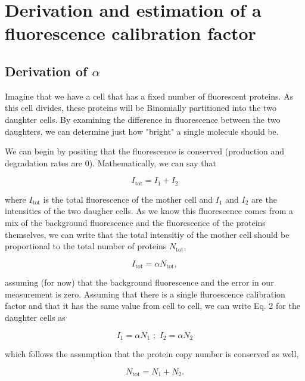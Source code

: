 \section{Derivation and estimation of a fluorescence calibration factor}

\subsection*{Derivation of $\alpha$}

Imagine that we have a cell that has a fixed number of fluorescent proteins.  As this cell divides, these proteins will be Binomially partitioned into the two daughter cells. By examining the difference in fluorescence between the two daughters, we can determine just how "bright" a single molecule should be.

We can begin by positing that the fluorescence is conserved (production and degradation rates are 0). Mathematically, we can say that

\begin{equation}
I_\text{tot} = I_1 + I_2
\end{equation}

where $I_\text{tot}$ is the total fluorescence of the mother cell and $I_1$ and
$I_2$ are the intensities of the two daugher cells. As we know this
fluorescence comes from a mix of the background fluorescence and the
fluorescence of the proteins themselves, we can write that the total intensitiy
of the mother cell should be proportional to the total number of proteins
$N_\text{tot}$,

\begin{equation}
I_\text{tot} = \alpha N_\text{tot},
\end{equation}

assuming (for now) that the background fluorescence and the error in our measurement is zero. Assuming that there is a single fluroescence calibration factor and that it has the same value from cell to cell, we can write Eq. 2 for the daughter cells as

\begin{equation}
I_1 = \alpha N_1\,\, ; \,\, I_2 = \alpha N_2
\end{equation}

which follows the assumption that the protein copy number is conserved as well,

\begin{equation}
N_\text{tot} = N_1 + N_2 \tag{5}.
\end{equation}

